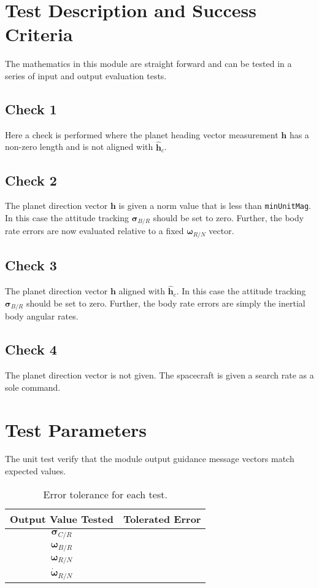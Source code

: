 
\section{Test Description and Success Criteria}
The mathematics in this module are straight forward and can be tested in a series of input and output evaluation tests.


\subsection{Check 1}
Here a check is performed where the planet heading vector measurement $\bm h$ has a non-zero length and is not aligned with $\hat{\bm h}_{c}$.  

\subsection{Check 2}
The planet direction vector $\bm h$ is given a norm value that is less than {\tt minUnitMag}.  In this case the attitude tracking $\bm\sigma_{B/R}$ should be set to zero.  Further, the body rate errors are now evaluated relative to a fixed $\bm\omega_{R/N}$ vector.  

\subsection{Check 3}
The planet direction vector $\bm h$ aligned with $\hat{\bm h}_{c}$.  In this case the attitude tracking $\bm\sigma_{B/R}$ should be set to zero.  Further, the body rate errors are simply the inertial body angular rates.  

\subsection{Check 4}
The planet direction vector is not given. The spacecraft is given a search rate as a sole command.



\section{Test Parameters}
The unit test verify that the module output guidance message vectors match expected values.
\begin{table}[htbp]
	\caption{Error tolerance for each test.}
	\label{tab:errortol}
	\centering \fontsize{10}{10}\selectfont
	\begin{tabular}{ c | c } %
		\hline\hline
		\textbf{Output Value Tested}  & \textbf{Tolerated Error}  \\ 
		\hline
		$\bm\sigma_{C/R}$        & 	   \\ 
		$\bm\omega_{B/R}$        & \\ 
		$\bm\omega_{R/N}$        &  \\ 
		$\dot{\bm\omega}_{R/N}$        &   \\ 
		\hline\hline
	\end{tabular}
\end{table}

